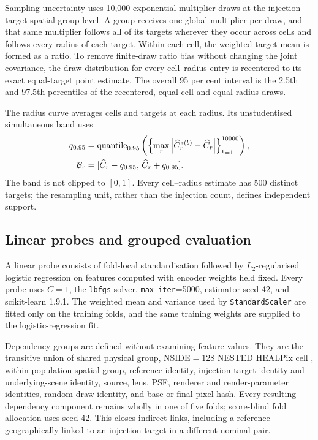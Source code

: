 Sampling uncertainty uses 10,000 exponential-multiplier draws at the
injection-target spatial-group level. A group receives one global multiplier
per draw, and that same multiplier follows all of its targets wherever they
occur across cells and follows every radius of each target. Within each cell,
the weighted target mean is formed as a ratio. To remove finite-draw ratio
bias without changing the joint covariance, the draw distribution for every
cell--radius entry is recentered to its exact equal-target point estimate.
The overall 95 per cent interval is the 2.5th and 97.5th percentiles of the
recentered, equal-cell and equal-radius draws.

The radius curve averages cells and targets at each radius. Its unstudentised
simultaneous band uses
\begin{equation}
\begin{aligned}
 q_{0.95}
 &=\operatorname{quantile}_{0.95}
 \left(
 \left\{\max_r\left|\widehat C^{*(b)}_r-\widehat C_r\right|\right\}
 _{b=1}^{10000}\right),\\
 {\cal B}_r&=[\widehat C_r-q_{0.95},\,\widehat C_r+q_{0.95}] .
\end{aligned}
\label{eq:grec_simultaneous_band}
\end{equation}
The band is not clipped to \([0,1]\). Every cell--radius estimate has 500
distinct targets; the resampling unit, rather than the injection count,
defines independent support.

\subsection{Linear probes and grouped evaluation}
\label{sec:linear_probe_methods}

A linear probe consists of fold-local standardisation followed by
\(L_2\)-regularised logistic regression on features computed with encoder
weights held fixed. Every probe uses \(C=1\), the \texttt{lbfgs} solver,
\texttt{max\_iter}=5000, estimator seed 42, and scikit-learn 1.9.1. The
weighted mean and variance used by \texttt{StandardScaler} are fitted only on
the training folds, and the same training weights are supplied to the
logistic-regression fit.

Dependency groups are defined without examining feature values. They are the
transitive union of shared physical group, NSIDE\(=128\) NESTED HEALPix cell
\citep{Gorski2005}, within-population spatial group, reference identity,
injection-target identity and underlying-scene identity, source, lens, PSF, renderer and
render-parameter identities, random-draw identity, and base or final pixel
hash. Every resulting dependency component remains wholly in one of five
folds; score-blind fold allocation uses seed 42. This closes indirect links,
including a reference geographically linked to an injection target in a
different nominal pair.

